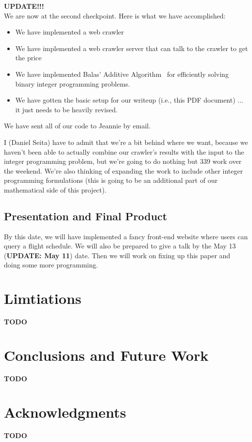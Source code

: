 \documentclass{article}
\begin{document}
{\bf UPDATE!!!} \\

We are now at the second checkpoint. Here is what we have accomplished:

\begin{itemize}
    \item We have implemented a web crawler
    \item We have implemented a web crawler server that can talk to the crawler to get the price
    \item We have implemented Balas' Additive Algorithm~\cite{doi:10.1287/opre.13.4.517} for efficiently solving binary integer programming problems.
    \item We have gotten the basic setup for our writeup (i.e., this PDF document) ... it just needs to be heavily revised.
\end{itemize}

We have sent all of our code to Jeannie by email.

I (Daniel Seita) have to admit that we're a bit behind where we want, because we haven't been able to actually combine our crawler's results with the
input to the integer programming problem, but we're going to do nothing but 339 work over the weekend. We're also thinking of expanding the work to
include other integer programming formulations (this is going to be an additional part of our mathematical side of this project).

\subsection{Presentation and Final Product}

By this date, we will have implemented a fancy front-end website where users can query a flight schedule. We will also be prepared to give a talk by
the May 13 ({\bf UPDATE: May 11}) date. Then we will work on fixing up this paper and doing some more programming.

\section{Limtiations}\label{sec:limitations}

{\bf TODO}

\section{Conclusions and Future Work}\label{sec:conclusions}

{\bf TODO}

\section*{Acknowledgments}
 
{\bf TODO}



\end{document}
